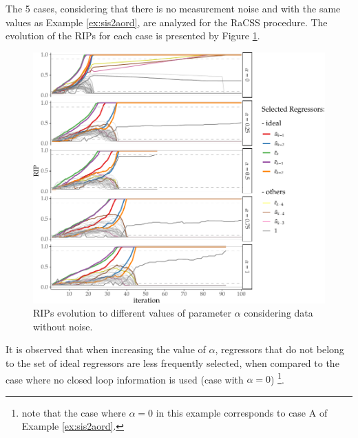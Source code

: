 \begin{exmp}
%
The 5 cases, considering that there is no measurement noise and with the same values as Example \ref{ex:sis2aord}, are analyzed for the RaCSS procedure. The evolution of the RIPs for each case is presented by Figure \ref{fig:exp51_ev_rips_a1_SR}.
  \begin{figure}[htpb]
    \centering
    \includegraphics{Figs/Cap5/ex51_rips_evol_SR.tex.pdf}
    \caption{RIPs evolution to different values of parameter $\alpha$ considering data without noise.}
    \label{fig:exp51_ev_rips_a1_SR}
  \end{figure}
It is observed that when increasing the value of $\alpha$, regressors that do not belong to the set of ideal regressors are less frequently selected, when compared to the case where no closed loop information is used (case with $\alpha=0$) \footnote { note that the case where $\alpha=0$ in this example corresponds to case A of Example \ref{ex:sis2aord}.}.


\end{exmp}
